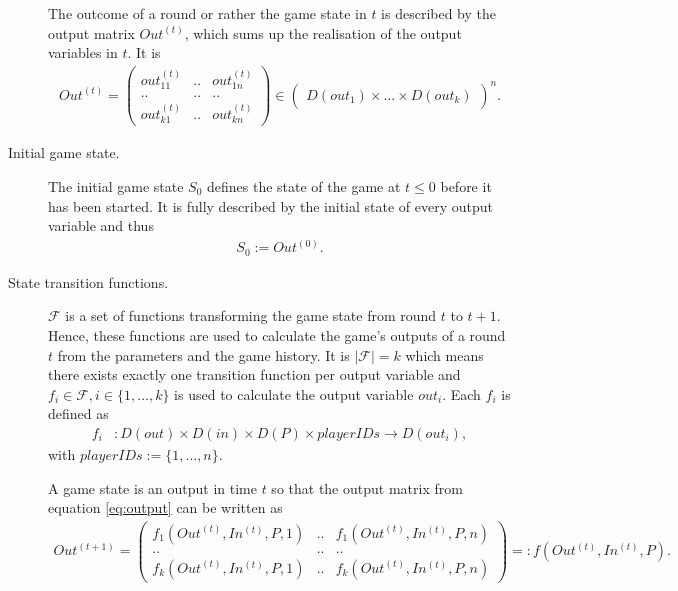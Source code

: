 \begin{description}
    The outcome of a round or rather the game state in $t$ is described by the output matrix $Out^{(t)}$, which sums up the realisation of the output variables in $t$. It is 
    \begin{align}
        Out^{(t)} = \begin{pmatrix}
        out_{11}^{(t)}&..&out_{1n}^{(t)}\\..&..&..\\out_{k1}^{(t)}&..&out_{kn}^{(t)}
        \end{pmatrix} \in \begin{pmatrix}
        D(out_1) \times \dots \times D(out_k)
        \end{pmatrix}^n. 
        \label{eq:output}
    \end{align}
    \item[Initial game state.] The initial game state $S_0$ defines the state of the game at $t \le 0$ before it has been started. It is fully described by the initial state of every output variable and thus 
    \begin{align}
        S_0 := Out^{(0)}.
        \label{eq:s0}
    \end{align}
    \item[State transition functions.] $\mathcal{F}$ is a set of functions transforming the game state from round $t$ to $t+1$. Hence, these functions are used to calculate the game's outputs of a round $t$ from the parameters and the game history. It is $|\mathcal{F}|=k$ which means there exists exactly one transition function per output variable and  $f_i \in \mathcal{F}, i\in\{1,\dots,k\}$ is used to calculate the output variable $out_i$. Each $f_i$ is defined as
    \begin{align} 
        f_i &\colon D(out) \times D(in) \times D(P) \times playerIDs \to D(out_i),  \label{eq:transition2} 
    \end{align} with $playerIDs := \{1,\dots,n\}$.
    
    A game state is an output in time $t$ so that the output matrix from equation \ref{eq:output} can be written as
    \begin{align}
        Out^{(t+1)} = \begin{pmatrix}
        f_1(Out^{(t)}, In^{(t)}, P, 1)&..&f_1(Out^{(t)}, In^{(t)}, P, n)\\..&..&..\\ f_k(Out^{(t)}, In^{(t)}, P, 1)&..&f_k(Out^{(t)}, In^{(t)}, P, n)
        \end{pmatrix} =: f(Out^{(t)}, In^{(t)}, P).
        \label{eq:state}
    \end{align}
    

\end{description}
